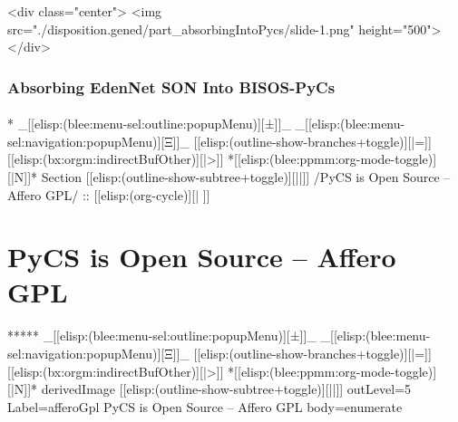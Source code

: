 \begin{htmlonly}

\begin{frame}[fragile,plain,label=part_absorbingIntoPycs]
    \frametitle{}
    \framesubtitle{}
    \begin{rawhtml}
<div class="center">
<img src="./disposition.gened/part_absorbingIntoPycs/slide-1.png" height="500">
</div>
    \end{rawhtml}
\end{frame}
\end{htmlonly}

\begin{verblatex}

\begin{frame}[fragile,label=part_absorbingIntoPycs]
    \frametitle{Absorbing EdenNet SON Into BISOS-PyCs}
    \framesubtitle{}

    \tableofcontents

\end{frame}
\end{verblatex}


\begin{whenOrg}
*  _[[elisp:(blee:menu-sel:outline:popupMenu)][±]]_ _[[elisp:(blee:menu-sel:navigation:popupMenu)][Ξ]]_ [[elisp:(outline-show-branches+toggle)][|=]] [[elisp:(bx:orgm:indirectBufOther)][|>]] *[[elisp:(blee:ppmm:org-mode-toggle)][|N]]*  Section    [[elisp:(outline-show-subtree+toggle)][||]]   /PyCS is Open Source -- Affero GPL/ ::  [[elisp:(org-cycle)][| ]]
\end{whenOrg}

\section{PyCS is Open Source -- Affero GPL}

\begin{whenOrg}
*****  _[[elisp:(blee:menu-sel:outline:popupMenu)][±]]_ _[[elisp:(blee:menu-sel:navigation:popupMenu)][Ξ]]_ [[elisp:(outline-show-branches+toggle)][|=]] [[elisp:(bx:orgm:indirectBufOther)][|>]] *[[elisp:(blee:ppmm:org-mode-toggle)][|N]]*  derivedImage [[elisp:(outline-show-subtree+toggle)][||]] outLevel=5 Label=afferoGpl PyCS is Open Source -- Affero GPL body=enumerate

\end{whenOrg}

